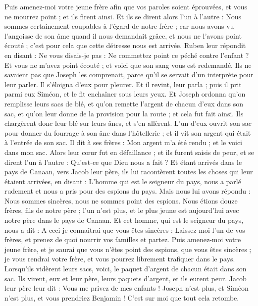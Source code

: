 \begin{multicols}{2}
Puis amenez-moi votre jeune frère afin que vos paroles soient éprouvées, et vous ne mourrez point ; et ils firent ainsi.
Et ils se dirent alors l'un à l'autre : Nous sommes certainement coupables à l'égard de notre frère ; car nous avons vu l'angoisse de son âme quand il nous demandait grâce, et nous ne l'avons point écouté ; c'est pour cela que cette détresse nous est arrivée.
Ruben leur répondit en disant : Ne vous disais-je pas : Ne commettez point ce péché contre l'enfant ? Et vous ne m’avez point écouté ; et voici que son sang vous est redemandé.
Ils ne savaient pas que Joseph les comprenait, parce qu'il se servait d’un interprète pour leur parler.
Il s’éloigna d’eux pour pleurer. Et il revint, leur parla ; puis il prit parmi eux Siméon, et le fit enchaîner sous leurs yeux.
Et Joseph ordonna qu'on remplisse leurs sacs de blé, et qu'on remette l'argent de chacun d’eux dans son sac, et qu'on leur donne de la provision pour la route ; et cela fut fait ainsi.
Ils chargèrent donc leur blé sur leurs ânes, et s'en allèrent.
L’un d'eux ouvrit son sac pour donner du fourrage à son âne dans l'hôtellerie ; et il vit son argent qui était à l’entrée de son sac.
Il dit à ses frères : Mon argent m'a été rendu ; et le voici dans mon sac. Alors leur cœur fut en défaillance ; et ils furent saisis de peur, et se dirent l'un à l'autre : Qu'est-ce que Dieu nous a fait ?
Et étant arrivés dans le pays de Canaan, vers Jacob leur père, ils lui racontèrent toutes les choses qui leur étaient arrivées, en disant :
L'homme qui est le seigneur du pays, nous a parlé rudement et nous a pris pour des espions du pays.
Mais nous lui avons répondu : Nous sommes sincères, nous ne sommes point des espions.
Nous étions douze frères, fils de notre père ; l'un n'est plus, et le plus jeune est aujourd'hui avec notre père dans le pays de Canaan.
Et cet homme, qui est le seigneur  du pays, nous a dit : A ceci je connaîtrai que vous êtes sincères : Laissez-moi l'un de vos frères, et prenez de quoi nourrir vos familles et partez.
Puis amenez-moi votre jeune frère, et je saurai que vous n'êtes point des espions, que vous êtes sincères ; je vous rendrai votre frère, et vous pourrez librement trafiquer dans le  pays.
Lorsqu’ils vidèrent leurs sacs, voici, le paquet d’argent de chacun était dans son sac. Ils virent, eux et leur père, leurs paquets d’argent, et ils eurent peur.
Jacob leur père leur dit : Vous me privez de mes enfants ! Joseph n'est plus, et Siméon n'est plus, et vous prendriez Benjamin ! C’est sur moi que tout cela retombe.

\end{multicols}
